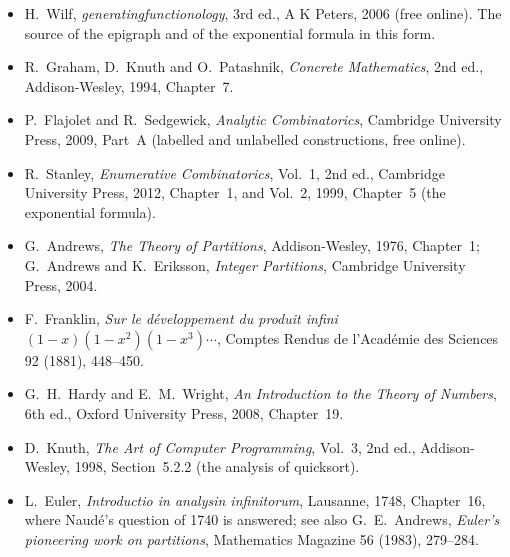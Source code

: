 \begin{itemize}
\item H.~Wilf, \emph{generatingfunctionology}, 3rd ed., A K Peters, 2006 (free online). The source of the epigraph and of
the exponential formula in this form.
\item R.~Graham, D.~Knuth and O.~Patashnik, \emph{Concrete Mathematics}, 2nd ed., Addison-Wesley, 1994, Chapter~7.
\item P.~Flajolet and R.~Sedgewick, \emph{Analytic Combinatorics}, Cambridge University Press, 2009, Part~A (labelled and
unlabelled constructions, free online).
\item R.~Stanley, \emph{Enumerative Combinatorics}, Vol.~1, 2nd ed., Cambridge University Press, 2012, Chapter~1, and
Vol.~2, 1999, Chapter~5 (the exponential formula).
\item G.~Andrews, \emph{The Theory of Partitions}, Addison-Wesley, 1976, Chapter~1; G.~Andrews and K.~Eriksson,
\emph{Integer Partitions}, Cambridge University Press, 2004.
\item F.~Franklin, \emph{Sur le d\'eveloppement du produit infini $(1-x)(1-x^2)(1-x^3)\cdots$}, Comptes Rendus de
l'Acad\'emie des Sciences 92 (1881), 448--450.
\item G.~H.~Hardy and E.~M.~Wright, \emph{An Introduction to the Theory of Numbers}, 6th ed., Oxford University Press,
2008, Chapter~19.
\item D.~Knuth, \emph{The Art of Computer Programming}, Vol.~3, 2nd ed., Addison-Wesley, 1998, Section~5.2.2 (the analysis of
quicksort).
\item L.~Euler, \emph{Introductio in analysin infinitorum}, Lausanne, 1748, Chapter~16, where Naud\'e's question of 1740 is answered; see also G.~E.~Andrews, \emph{Euler's pioneering work on partitions}, Mathematics Magazine 56 (1983), 279--284.
\end{itemize}
